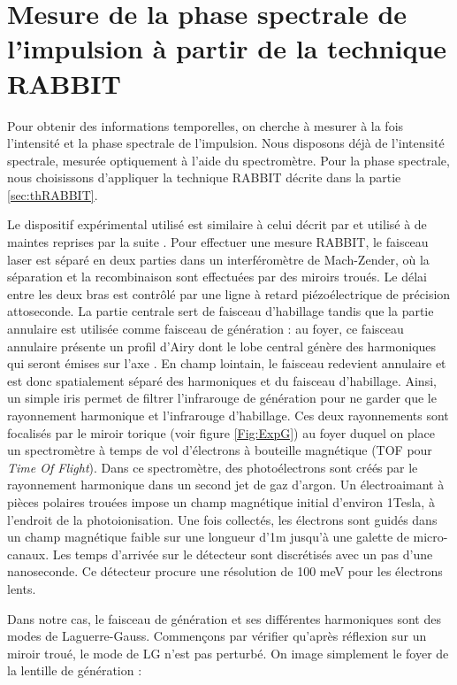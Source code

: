 \section{Mesure de la phase spectrale de l'impulsion à partir de la technique RABBIT}
\label{omabbit}
Pour obtenir des informations temporelles, on cherche à mesurer à la fois l'intensité et la phase spectrale de l'impulsion. Nous disposons déjà de l'intensité spectrale, mesurée optiquement à l'aide du spectromètre. Pour la phase spectrale, nous choisissons d'appliquer la technique RABBIT décrite dans la partie \ref{sec:thRABBIT}.

Le dispositif expérimental utilisé est similaire à celui décrit par  et utilisé à de maintes reprises par la suite . Pour effectuer une mesure RABBIT, le faisceau laser est séparé en deux parties dans un interféromètre de Mach-Zender, où la séparation et la recombinaison sont effectuées par des miroirs troués. Le délai entre les deux bras est contrôlé par une ligne à retard piézoélectrique de précision attoseconde. La partie centrale sert de faisceau d'habillage tandis que la partie annulaire est utilisée comme faisceau de génération : au foyer, ce faisceau annulaire présente un profil d'Airy dont le lobe central génère des harmoniques qui seront émises sur l'axe . En champ lointain, le faisceau redevient annulaire et est donc spatialement séparé des harmoniques et du faisceau d'habillage. Ainsi, un simple iris permet de filtrer l'infrarouge de génération pour ne garder que le rayonnement harmonique et l'infrarouge d'habillage. Ces deux rayonnements sont focalisés par le miroir torique (voir figure \ref{Fig:ExpG}) au foyer duquel on place un spectromètre à temps de vol d'électrons à bouteille magnétique (TOF pour \textit{Time Of Flight}). Dans ce spectromètre, des photoélectrons sont créés par le rayonnement harmonique dans un second jet de gaz d'argon. Un électroaimant à pièces polaires trouées impose un champ magnétique initial d’environ 1Tesla, à l’endroit de la photoionisation. Une fois collectés, les électrons sont guidés dans un champ magnétique faible sur une longueur d’1m jusqu'à une galette de micro-canaux. Les temps d’arrivée sur le détecteur sont discrétisés avec un pas d’une nanoseconde. Ce détecteur procure une résolution de 100 meV pour les électrons lents. 

Dans notre cas, le faisceau de génération et ses différentes harmoniques sont des modes de Laguerre-Gauss. Commençons par vérifier qu'après réflexion sur un miroir troué, le mode de LG n'est pas perturbé. On image simplement le foyer de la lentille de génération :
%

